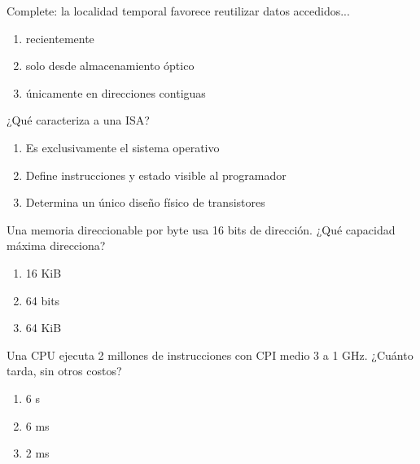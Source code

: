 \noindent\begin{minipage}{\linewidth}\setlength{\parskip}{4pt}\label{q:H-028}
Complete: la localidad temporal favorece reutilizar datos accedidos...
\begin{enumerate}[label=\Alph*),nosep]
\item recientemente
\item solo desde almacenamiento óptico
\item únicamente en direcciones contiguas
\end{enumerate}\end{minipage}\par\medskip

\noindent\begin{minipage}{\linewidth}\setlength{\parskip}{4pt}\label{q:H-029}
¿Qué caracteriza a una ISA?
\begin{enumerate}[label=\Alph*),nosep]
\item Es exclusivamente el sistema operativo
\item Define instrucciones y estado visible al programador
\item Determina un único diseño físico de transistores
\end{enumerate}\end{minipage}\par\medskip

\noindent\begin{minipage}{\linewidth}\setlength{\parskip}{4pt}\label{q:H-030}
Una memoria direccionable por byte usa 16 bits de dirección. ¿Qué capacidad máxima direcciona?
\begin{enumerate}[label=\Alph*),nosep]
\item 16 KiB
\item 64 bits
\item 64 KiB
\end{enumerate}\end{minipage}\par\medskip

\noindent\begin{minipage}{\linewidth}\setlength{\parskip}{4pt}\label{q:H-031}
Una CPU ejecuta 2 millones de instrucciones con CPI medio 3 a 1 GHz. ¿Cuánto tarda, sin otros costos?
\begin{enumerate}[label=\Alph*),nosep]
\item 6 s
\item 6 ms
\item 2 ms
\end{enumerate}\end{minipage}\par\medskip

